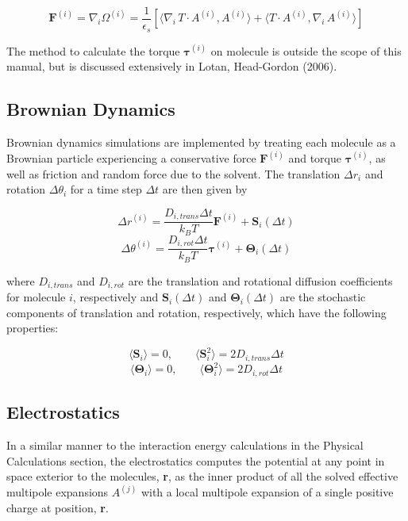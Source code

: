 \[ \textbf{F}^{(i)} = \nabla_i \Omega^{(i)}=\frac{1}{\epsilon_s} [ \langle \nabla_i \,T \cdot A^{(i) } ,  A^{(i) } \rangle +  \langle T \cdot A^{(i) } ,   \nabla_i \, A^{(i) } \rangle ]\]


The method to calculate the torque $\boldsymbol{\tau}^{(i)}$ on molecule is outside the scope of this manual, but is discussed extensively in Lotan, Head-Gordon (2006).

\subsection{Brownian Dynamics}

Brownian dynamics simulations are implemented by treating each molecule as a Brownian particle experiencing a conservative force $\textbf{F}^{(i)}$ and torque $\boldsymbol{\tau}^{(i)}$, as well as friction and random force due to the solvent. The translation $\Delta r_i$ and rotation $\Delta \theta_i$ for a time step $\Delta t$ are then given by

\[\Delta r^{(i)} = \frac{D_{i, trans} \Delta t}{k_B T} \textbf{F}^{(i)} + \textbf{S}_i(\Delta t)\]
\[\Delta \theta^{(i)} = \frac{D_{i, rot} \Delta t}{k_B T} \boldsymbol{\tau}^{(i)} + \boldsymbol{\Theta}_i(\Delta t)\]

where $D_{i, trans}$ and $D_{i, rot}$ are the translation and rotational diffusion coefficients for molecule $i$, respectively and $\textbf{S}_i(\Delta t)$ and $\boldsymbol{\Theta}_i(\Delta t)$ are the stochastic components of translation and rotation, respectively, which have the following properties:

\[\langle \textbf{S}_i \rangle=0, \qquad \langle \textbf{S}_i^2 \rangle=2D_{i, trans}\Delta t\]
\[\langle \boldsymbol{\Theta}_i \rangle=0, \qquad \langle \boldsymbol{\Theta}_i^2 \rangle=2D_{i, rot}\Delta t\]

\subsection{Electrostatics}

In a similar manner to the interaction energy calculations in the Physical Calculations section, the electrostatics computes the potential at any point in space exterior to the molecules, \textbf{r}, as the inner product of all the solved effective multipole expansions \(A^{(j)}\) with a local multipole expansion of a single positive charge at position, \textbf{r}.


